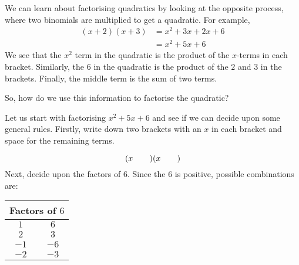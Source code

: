 We can learn about factorising quadratics by looking at the opposite
process, where two binomials are multiplied to get a quadratic. For
example,
\begin{align*}
  (x+2)(x+3) &= x^2+3x+2x+6 \\
  &= {x}^{2}+5x+6
\end{align*}
We see that the ${x}^{2}$ term in the quadratic is the product of the $x$-terms in each bracket. Similarly, the $6$ in the quadratic is the product of the $2$ and $3$ in the brackets. Finally, the middle term is the sum of two terms.\par 
So, how do we use this information to factorise the quadratic?\par 
Let us start with factorising ${x}^{2}+5x+6$ and see if we can decide upon some general rules. Firstly, write down two brackets with an $x$ in each bracket and space for the remaining terms.\par 
\begin{equation*}
(x\phantom{\rule{2.em}{0ex}})(x\phantom{\rule{2.em}{0ex}})
\end{equation*}
Next, decide upon the factors of $6$. Since the $6$ is positive, possible combinations are:\par 
\begin{table}[H]
\begin{center}
\begin{tabular}[t]{|c|c|}\hline
\multicolumn{2}{|c|}{\textbf{Factors of $6$}}
\\ \hline
$1$ &
$6$%
\\ \hline
$2$ &
$3$%
\\ \hline
$-1$ &
$-6$%
\\ \hline
$-2$ &
$-3$%
\\ \hline
\end{tabular}
\end{center}
\end{table}
